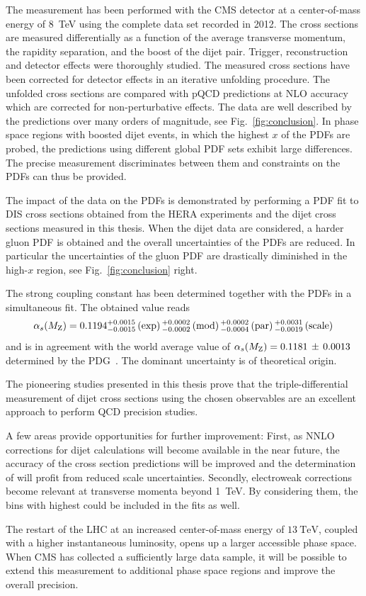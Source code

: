 The measurement has been performed with the CMS detector at a center-of-mass
energy of \SI{8}{\TeV} using the complete data set recorded in 2012. The cross
sections are measured differentially as a function of the average transverse
momentum, the rapidity separation, and the boost of the dijet pair. Trigger,
reconstruction and detector effects were thoroughly studied. The measured cross
sections have been corrected for detector effects in an iterative unfolding
procedure. The unfolded cross sections are compared with pQCD predictions at NLO
accuracy which are corrected for non-perturbative effects. The data are well
described by the predictions over many orders of magnitude, see
Fig.~\ref{fig:conclusion}. In phase space regions with boosted dijet events, in
which the highest $x$ of the PDFs are probed, the predictions using different
global PDF sets exhibit large differences. The precise measurement discriminates
between them and constraints on the PDFs can thus be provided. 

The impact of the data on the PDFs is demonstrated by performing a PDF fit to
DIS cross sections obtained from the HERA experiments and the dijet cross sections measured
in this thesis. When the dijet data are considered, a harder gluon PDF is obtained
and the overall uncertainties of the PDFs are reduced. In particular the uncertainties of
the gluon PDF are drastically diminished in the high-$x$ region, see
Fig.~\ref{fig:conclusion} right.

The strong coupling constant \asmz has been determined together with the PDFs in
a simultaneous fit. The obtained value reads
%
\begin{equation*}
    \alpha_{s}(M_\mathrm{Z}) = 0.1194_{-0.0015}^{+0.0015}\,(\mathrm{exp})\,
    {}_{-0.0002}^{+0.0002}\,(\mathrm{mod})\,{}_{-0.0004}^{+0.0002}\,(\mathrm{par})\,
    {}_{-0.0019}^{+0.0031}\,(\mathrm{scale})\,
\end{equation*}
%
and is in agreement with the world average value of $\alpha_{s}(M_\mathrm{Z}) = 0.1181 \,\pm\, 0.0013$
determined by the PDG~\cite{Agashe:2014kda}. The dominant uncertainty is of
theoretical origin.

The pioneering studies presented in this thesis prove that the triple-differential
measurement of dijet cross sections using the chosen observables are an
excellent approach to perform QCD precision studies.

A few areas provide opportunities for further improvement: First, as NNLO
corrections for dijet calculations will become available in the near future, the
accuracy of the cross section predictions will be improved and the determination
of \asmz will profit from reduced scale uncertainties. Secondly, electroweak
corrections become relevant at transverse momenta beyond \SI{1}{\TeV}. By
considering them, the bins with highest \ptavg could be included in the fits as
well.

The restart of the LHC at an increased center-of-mass energy of $\SI{13}{\TeV}$,
coupled with a higher instantaneous luminosity, opens up a larger
accessible phase space. When CMS has collected a sufficiently large data sample,
it will be possible to extend this measurement to additional phase space regions
and improve the overall precision.

